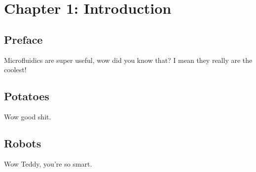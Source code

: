 \chapter{Chapter 1: Introduction}\label{Chap:Introduction}

\section{Preface}
Microfluidics are super useful, wow did you know that? I mean they really are the coolest!

\section{Potatoes}
Wow good shit.

\section{Robots}
Wow Teddy, you're so smart.





